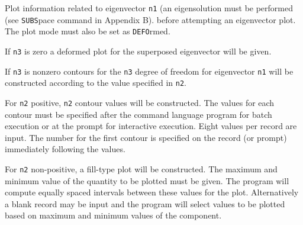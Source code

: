 \headb

Plot information related to eigenvector {\tt n1} (an eigensolution
must be performed (see {\tt SUBS}pace command in Appendix B).
before attempting an eigenvector plot.  The plot mode must also be
set as {\tt DEFO}rmed.

If {\tt n3} is zero a deformed plot for the superposed eigenvector
will be given.

If {\tt n3} is nonzero contours for the {\tt n3} degree of
freedom for eigenvector {\tt n1} will be constructed according
to the value specified in {\tt n2}.

For {\tt n2} positive, {\tt n2} contour values will be constructed.
The values for each contour must be specified
after the command language program for batch execution or at
the prompt for interactive execution.  Eight values per
record are input.  The number for the first contour is
specified on the record (or prompt) immediately following
the values.

For {\tt n2} non-positive, a fill-type plot will be constructed.
The maximum and minimum value of the quantity to
be plotted must be given.  The program will compute equally
spaced intervals between these values for the plot.  Alternatively
a blank record may be input and the program will
select values to be plotted based on maximum and minimum values of
the component.
\vfill
\eject

